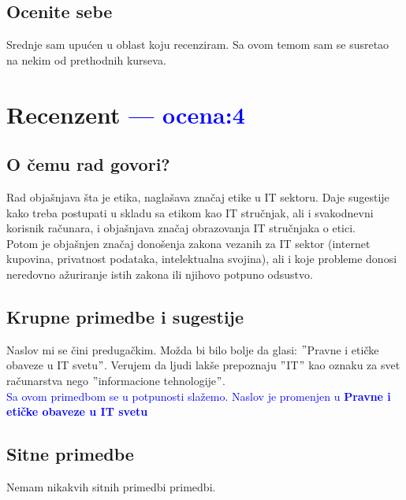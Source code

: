 \documentclass[a4paper]{report}
\newcommand{\odgovor}[1]{\textcolor{blue}{#1}}
\begin{document}
\section{Ocenite sebe}
Srednje sam upućen u oblast koju recenziram. Sa ovom temom sam se susretao na nekim od prethodnih kurseva.

\chapter{Recenzent \odgovor{--- ocena:4} }

\section{O čemu rad govori?}
Rad objašnjava šta je etika, naglašava značaj etike u IT sektoru. Daje sugestije kako treba postupati u skladu sa etikom kao IT stručnjak, ali i svakodnevni korisnik računara, i objašnjava značaj obrazovanja IT stručnjaka o etici.\\
Potom je objašnjen značaj donošenja zakona vezanih za IT sektor (internet kupovina, privatnost podataka, intelektualna svojina), ali i koje probleme donosi neredovno ažuriranje istih zakona ili njihovo potpuno odsustvo.

\section{Krupne primedbe i sugestije}
Naslov mi se čini predugačkim. Možda bi bilo bolje da glasi: $"$Pravne i etičke obaveze u IT svetu$"$. Verujem da ljudi lakše prepoznaju $"$IT$"$ kao oznaku za svet računarstva nego $"$informacione tehnologije$"$.  \\

\odgovor{Sa ovom primedbom se u potpunosti slažemo. Naslov je promenjen u \textbf{Pravne i \-etičke obaveze u IT svetu}}

\section{Sitne primedbe}
Nemam nikakvih sitnih primedbi primedbi.
\end{document}
